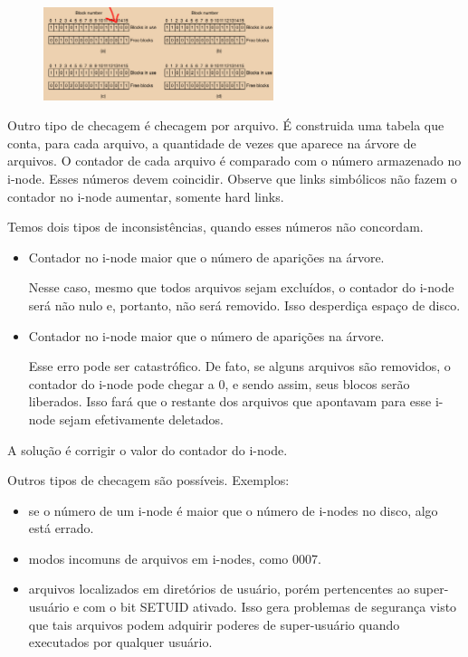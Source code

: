 \documentclass{article}
\begin{document}
\begin{figure}[h]
  \begin{center}
    \includegraphics[width=0.6\textwidth]{img/5-19.png}
  \end{center}
  \caption{}
  \label{fig:}
\end{figure}


Outro tipo de checagem é checagem por arquivo. É construida uma tabela que conta, para cada arquivo, a quantidade de vezes que aparece na árvore de arquivos. O contador de cada arquivo é comparado com o número armazenado no i-node. Esses números devem coincidir. Observe que links simbólicos não fazem o contador no i-node aumentar, somente hard links.

Temos dois tipos de inconsistências, quando esses números não concordam.

\begin{itemize}
  \item {\color{blue} Contador no i-node maior que o número de aparições na árvore.}

    Nesse caso, mesmo que todos arquivos sejam excluídos, o contador do i-node será não nulo e, portanto, não será removido. Isso desperdiça espaço de disco.   
  \item {\color{blue} Contador no i-node maior que o número de aparições na árvore.}
  
    Esse erro pode ser catastrófico. De fato, se alguns arquivos são removidos, o contador do i-node pode chegar a 0, e sendo assim, seus blocos serão liberados. Isso fará que o restante dos arquivos que apontavam para esse i-node sejam efetivamente deletados. 
\end{itemize}

A solução é corrigir o valor do contador do i-node.

Outros tipos de checagem são possíveis. Exemplos: 
\begin{itemize}
  \item se o número de um i-node é maior que o número de i-nodes no disco, algo está errado. 
  \item modos incomuns de arquivos em i-nodes, como 0007.
  \item arquivos localizados em diretórios de usuário, porém pertencentes ao super-usuário e com o bit SETUID ativado. Isso gera problemas de segurança visto que tais arquivos podem adquirir poderes de super-usuário quando executados por qualquer usuário.
\end{itemize}
\end{document}

